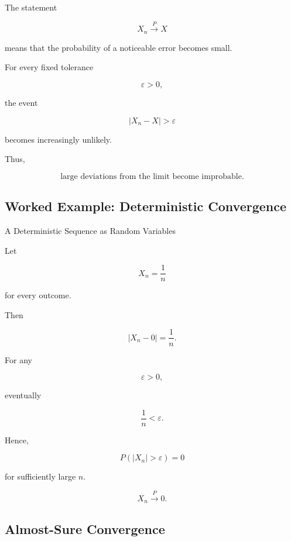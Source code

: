 The statement

\[
X_n
\xrightarrow{P}
X
\]

means that the probability of a noticeable error becomes small.

For every fixed tolerance

\[
\varepsilon>0,
\]

the event

\[
|X_n-X|>\varepsilon
\]

becomes increasingly unlikely.

Thus,

\[
\boxed{
\text{large deviations from the limit become improbable}.
}
\]

\subsection{Worked Example: Deterministic Convergence}
\label{subsec:worked-deterministic-probability-convergence}

\begin{workedexamplebox}{A Deterministic Sequence as Random Variables}

Let

\[
X_n=\frac1n
\]

for every outcome.

Then

\[
|X_n-0|
=
\frac1n.
\]

For any

\[
\varepsilon>0,
\]

eventually

\[
\frac1n<\varepsilon.
\]

Hence,

\[
P(|X_n|>\varepsilon)=0
\]

for sufficiently large \(n\).

\begin{answerbox}
\[
\boxed{
X_n
\xrightarrow{P}
0.
}
\]
\end{answerbox}

\end{workedexamplebox}

\subsection{Almost-Sure Convergence}
\label{subsec:almost-sure-convergence}

